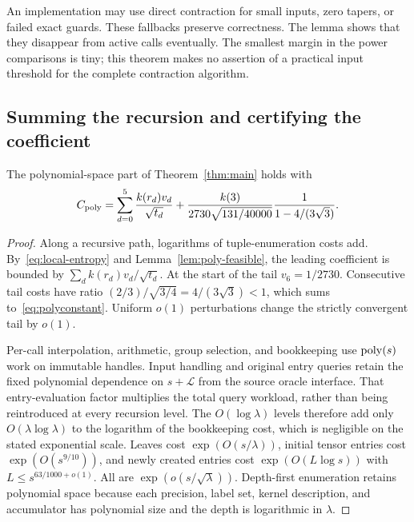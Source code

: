 An implementation may use direct contraction for small inputs, zero tapers,
or failed exact guards. These fallbacks preserve correctness. The lemma shows
that they disappear from active calls eventually. The smallest margin in the
power comparisons is tiny; this theorem makes no assertion of a practical
input threshold for the complete contraction algorithm.

\subsection{Summing the recursion and certifying the coefficient}
\begin{proposition}\label{prop:poly-cost}
The polynomial-space part of Theorem~\ref{thm:main} holds with
\begin{equation}\label{eq:polyconstant}
 C_{\mathrm{poly}}=\sum_{d=0}^{5}\frac{k(r_d)v_d}{\sqrt{t_d}}
 +\frac{k(3)}{2730\sqrt{131/40000}}
   \frac{1}{1-4/(3\sqrt3)}.
\end{equation}
\end{proposition}
\begin{proof}
Along a recursive path, logarithms of tuple-enumeration costs add.
By~\eqref{eq:local-entropy} and Lemma~\ref{lem:poly-feasible}, the leading
coefficient is bounded by $\sum_d k(r_d)v_d/\sqrt{t_d}$.
At the start of the tail $v_6=1/2730$. Consecutive tail costs have ratio
$(2/3)/\sqrt{3/4}=4/(3\sqrt3)<1$, which sums to~\eqref{eq:polyconstant}.
Uniform $o(1)$ perturbations change the strictly convergent tail by $o(1)$.

Per-call interpolation, arithmetic, group selection, and bookkeeping use
$\operatorname{poly}(s)$ work on immutable handles. Input handling and original entry
queries retain the fixed polynomial dependence on $s+\mathcal L$ from the
source oracle interface. That entry-evaluation factor multiplies the total
query workload, rather than being reintroduced at every recursion level.
The $O(\log\lambda)$ levels therefore add only
$O(\lambda\log\lambda)$ to the logarithm of the bookkeeping cost,
which is negligible on the stated exponential scale.
Leaves cost $\exp(O(s/\lambda))$, initial tensor entries cost
$\exp(O(s^{9/10}))$, and newly created entries cost
$\exp(O(L\log s))$ with $L\le s^{63/1000+o(1)}$. All are
$\exp(o(s/\sqrt\lambda))$. Depth-first enumeration retains polynomial
space because each precision, label set, kernel description, and accumulator
has polynomial size and the depth is logarithmic in $\lambda$.
\end{proof}

